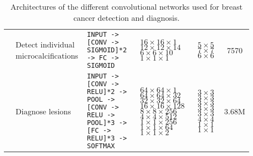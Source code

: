 \begin{landscape}
\begin{table}
\begin{tabular}{cp{3.3cm}p{7cm}p{2cm}p{1.1cm}c}
		\cite{Ge2006}& Detect individual microcalcifications & \texttt{INPUT -> [CONV -> SIGMOID]*2 -> FC -> SIGMOID} & $16\times 16 \times 1$ \newline $12 \times 12 \times 14$\newline $6\times 6 \times 10$\newline $1 \times 1 \times 1$ & $5 \times 5$\newline $7 \times 7$ \newline $6 \times 6$& 7570 \\
		\cite{Agarwal2015}& Diagnose lesions & \texttt{INPUT -> [CONV -> RELU]*2 -> POOL -> [CONV -> RELU -> POOL]*3 -> [FC -> RELU]*3 -> SOFTMAX} & $64\times 64 \times 1$ \newline $64 \times 64 \times 32$\newline $32\times 32 \times 64$\newline $16 \times 16 \times 128$ \newline $8 \times 8 \times 256$ \newline $4 \times 4 \times 512$ \newline $1 \times 1 \times 256$ \newline $1 \times 1 \times 64$ \newline $1 \times 1 \times 2$ & $3 \times 3$ \newline $3 \times 3$ \newline $3 \times 3$ \newline $3 \times 3$ \newline $3 \times 3$ \newline $4 \times 4$ \newline $1 \times 1$ \newline $1 \times 1$ & 3.68M \\
	\hline
	\end{tabular}
	\label{tab:BrCaConvNetArchitectures}
	\caption[Breast Cancer Convolutional Network Architectures]{Architectures of the different convolutional networks used for breast cancer detection and diagnosis.}
\end{table}
\end{landscape}
\begin{comment} 
Groups working on convnets for breast cancer:
Georgetown University Medical Center: Shih-Chung Lo, Matthew Freedman, Huai Li
Michigan Medical Center: Heang-Ping Chan, Sahiner, Hadjiiski, Helvie, Gurcan, Wei j and Ge, J
University of chicago (MTANN): Suzuki Kenji (not quite convnets)


Other deep learning applications:
Cruz-Roa mitosis detection in breast cancer histology images,
Ciresan similar

CAD review:
Tang2009
2013 breast cancer diagnosis a review or other good review.
Work at Tec.
\end{comment}


